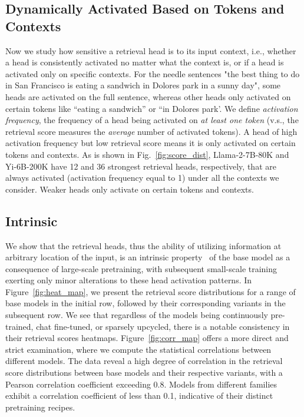 \subsection{Dynamically Activated Based on Tokens and Contexts}
Now we study how sensitive a retrieval head is to its input context, i.e.,
whether a head is consistently activated no matter what the context is, or if a head is activated only on specific contexts.
For the needle sentences "the best thing to do in San Francisco is eating a sandwich in Dolores park in a sunny day", some heads are activated on the full sentence, whereas other heads  only activated on certain tokens like ``eating a sandwich'' or ``in Dolores park'. 
We define \textit{activation frequency}, the frequency of a head being activated on \textit{at least one token} (v.s., the retrieval score measures the \textit{average} number of activated tokens). 
A head of high activation frequency but low retrieval score means it is only activated on certain tokens and contexts.
As is shown in Fig.~\ref{fig:score_dist}, 
Llama-2-7B-80K and Yi-6B-200K have 12 and 36 strongest retrieval heads, respectively, that are always activated (activation frequency equal to 1) under all the contexts we consider. 
Weaker heads only activate on certain tokens and contexts. 


\subsection{Intrinsic}

We show that the retrieval heads, thus the ability of utilizing information at arbitrary location of the input, is an intrinsic property~\citep{fu2024data} of the base model as a consequence of large-scale pretraining, with subsequent small-scale training exerting only minor alterations to these head activation patterns.
In Figure~\ref{fig:heat_map}, we present the retrieval score distributions for a range of base models in the initial row, followed by their corresponding variants in the subsequent row. We see that regardless of the models being continuously pre-trained, chat fine-tuned, or sparsely upcycled, there is a notable consistency in their retrieval scores heatmaps. 
Figure~\ref{fig:corr_map} offers a more direct and strict examination, where we compute the statistical correlations between different models. 
The data reveal a high degree of correlation in the retrieval score distributions between base models and their respective variants, with a Pearson correlation coefficient exceeding 0.8. 
Models from different families exhibit a correlation coefficient of less than 0.1, indicative of their distinct pretraining recipes.





